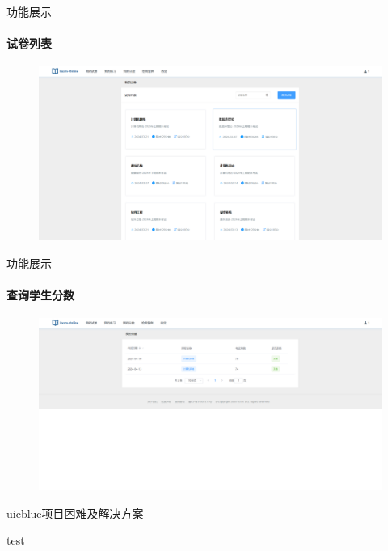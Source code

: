 \documentclass{beamer}
\begin{document}
\begin{frame}[fragile]{功能展示}
\framesubtitle{试卷列表}
\begin{figure}
    \centering
    \includegraphics[width=0.75\linewidth]{4.png}
\end{figure}
\end{frame}

\begin{frame}[fragile]{功能展示}
\framesubtitle{查询学生分数}
\begin{figure}
    \centering
    \includegraphics[width=0.75\linewidth]{5.png}
\end{figure}
\end{frame}

\begin{chapter}{uicblue}{项目困难及解决方案}
\end{chapter}


\begin{frame}[fragile]{test}

\end{frame}




\backmatter
\end{document}
